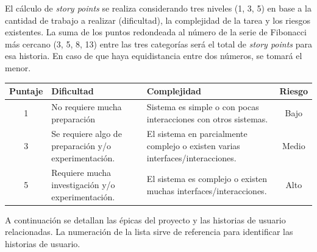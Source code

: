 \documentclass[
11pt, %
]{charter}
\begin{document}
El cálculo de \textit{story points} se realiza considerando tres niveles (1, 3, 5) en base a la cantidad de trabajo a realizar (dificultad), la complejidad de la tarea y los riesgos existentes. La suma de los puntos redondeada al número de la serie de Fibonacci más cercano (3, 5, 8, 13) entre las tres categorías será el total de \textit{story points} para esa historia. En caso de que haya equidistancia entre dos números, se tomará el menor.

\begin{table}[htpb]
\centering
\begin{tabularx}{\linewidth}{@{}|c|X|X|c|@{}}
\hline
\rowcolor[HTML]{C0C0C0}
Puntaje & Dificultad & Complejidad & Riesgo \\ \hline
1 & No requiere mucha preparación & Sistema es simple o con pocas interacciones con otros sistemas. & Bajo \\ \hline
3 & Se requiere algo de preparación y/o experimentación. & El sistema en parcialmente complejo o existen varias interfaces/interacciones. & Medio \\ \hline
5 & Requiere mucha investigación y/o experimentación. & El sistema es complejo o existen muchas interfaces/interacciones. & Alto \\ \hline
\end{tabularx}
\end{table}

A continuación se detallan las épicas del proyecto y las historias de usuario relacionadas. La numeración de la lista sirve de referencia para identificar las historias de usuario.
\end{document}
